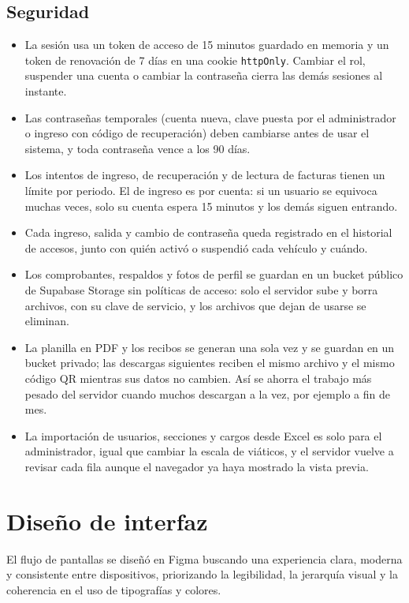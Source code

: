 \documentclass[11pt,letterpaper]{article}
\newcommand{\code}[1]{\nolinkurl{#1}}
\begin{document}
\subsection{Seguridad}
\begin{itemize}
  \item La sesión usa un token de acceso de 15 minutos guardado en memoria y un token de renovación de 7 días en una cookie \code{httpOnly}. Cambiar el rol, suspender una cuenta o cambiar la contraseña cierra las demás sesiones al instante.
  \item Las contraseñas temporales (cuenta nueva, clave puesta por el administrador o ingreso con código de recuperación) deben cambiarse antes de usar el sistema, y toda contraseña vence a los 90 días.
  \item Los intentos de ingreso, de recuperación y de lectura de facturas tienen un límite por periodo. El de ingreso es por cuenta: si un usuario se equivoca muchas veces, solo su cuenta espera 15 minutos y los demás siguen entrando.
  \item Cada ingreso, salida y cambio de contraseña queda registrado en el historial de accesos, junto con quién activó o suspendió cada vehículo y cuándo.
  \item Los comprobantes, respaldos y fotos de perfil se guardan en un bucket público de Supabase Storage sin políticas de acceso: solo el servidor sube y borra archivos, con su clave de servicio, y los archivos que dejan de usarse se eliminan.
  \item La planilla en PDF y los recibos se generan una sola vez y se guardan en un bucket privado; las descargas siguientes reciben el mismo archivo y el mismo código QR mientras sus datos no cambien. Así se ahorra el trabajo más pesado del servidor cuando muchos descargan a la vez, por ejemplo a fin de mes.
  \item La importación de usuarios, secciones y cargos desde Excel es solo para el administrador, igual que cambiar la escala de viáticos, y el servidor vuelve a revisar cada fila aunque el navegador ya haya mostrado la vista previa.
\end{itemize}

\section{Diseño de interfaz}
El flujo de pantallas se diseñó en Figma buscando una experiencia clara, moderna y consistente entre dispositivos, priorizando la legibilidad, la jerarquía visual y la coherencia en el uso de tipografías y colores.
\end{document}
